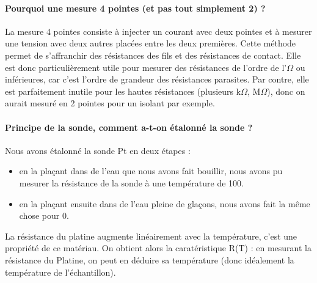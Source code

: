 \paragraph*{Pourquoi une mesure 4 pointes (et pas tout simplement 2) ?}
La mesure 4 pointes consiste à injecter un courant avec deux pointes et à mesurer une tension avec deux autres placées entre les deux premières.
Cette méthode permet de s'affranchir des résistances des fils et des résistances de contact.
Elle est donc particulièrement utile pour mesurer des résistances de l'ordre de l'$\Omega$ ou inférieures, car c'est l'ordre de grandeur des résistances parasites.
Par contre, elle est parfaitement inutile pour les hautes résistances (plusieurs k$\Omega$, M$\Omega$), donc on aurait mesuré en 2 pointes pour un isolant par exemple.


\paragraph*{Principe de la sonde, comment a-t-on étalonné la sonde ?}
Nous avons étalonné la sonde Pt en deux étapes :


\begin{itemize}
  \item en la plaçant dans de l'eau que nous avons fait bouillir, nous avons pu mesurer la résistance de la sonde à une température de 100\celsius.
  \item en la plaçant ensuite dans de l'eau pleine de glaçons, nous avons fait la même chose pour 0\celsius.
\end{itemize}


La résistance du platine augmente linéairement avec la température, c'est une propriété de ce matériau.
On obtient alors la caratéristique R(T) : en mesurant la résistance du Platine, on peut en déduire sa température (donc idéalement la température de l'échantillon).


